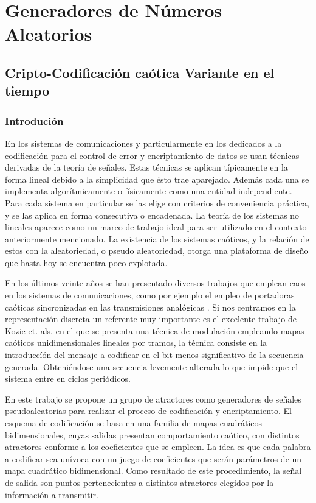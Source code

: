 \chapter{Generadores de Números Aleatorios}

\section{Cripto-Codificación caótica Variante en el tiempo}

\subsection{Introdución}

En los sistemas de comunicaciones y particularmente en los
dedicados a la codificación para el control de error y
encriptamiento de datos se usan técnicas derivadas de la teoría de
señales. Estas técnicas se aplican típicamente en la forma lineal
debido a la simplicidad que ésto trae aparejado. Además cada una se
implementa algorítmicamente o físicamente como una entidad
independiente. Para cada sistema en particular se las elige
con criterios de conveniencia práctica, y se las aplica en forma
consecutiva o encadenada. La teoría de los sistemas no lineales
\cite{Strogatz1994,Lasota1994} aparece como un marco de trabajo
ideal para ser utilizado en el contexto anteriormente mencionado.
La existencia de los sistemas caóticos, y la relación de estos con
la aleatoriedad, o pseudo aleatoriedad, otorga una plataforma de
diseño que hasta hoy se encuentra poco explotada.

En los últimos veinte años se han presentado diversos trabajos que
emplean caos en los sistemas de comunicaciones, como por ejemplo
el empleo de portadoras caóticas sincronizadas en las
transmisiones analógicas \cite{Kocarev1995,Hidalgo2001}. Si nos
centramos en la representación discreta un referente muy
importante es el excelente trabajo de Kozic et. als.
\cite{Kozic2006A,Kozic2006B} en el que se presenta una técnica de
modulación empleando mapas caóticos unidimensionales lineales por
tramos, la técnica consiste en la introduccíón del mensaje a
codificar en el bit menos significativo de la secuencia generada.
Obteniéndose una secuencia levemente alterada lo que impide que el
sistema entre en ciclos periódicos.

En este trabajo se propone un grupo de atractores como generadores de señales
pseudoaleatorias para realizar el proceso de codificación y
encriptamiento. El esquema de codificación se basa
en una familia de mapas cuadráticos bidimensionales, cuyas salidas
presentan comportamiento caótico, con distintos atractores
conforme a los coeficientes que se empleen. La idea es que cada
palabra a codificar sea unívoca con un juego de coeficientes que
serán parámetros de un mapa cuadrático bidimensional. Como
resultado de este procedimiento, la señal de salida son puntos
pertenecientes a distintos atractores elegidos por la información
a transmitir.

